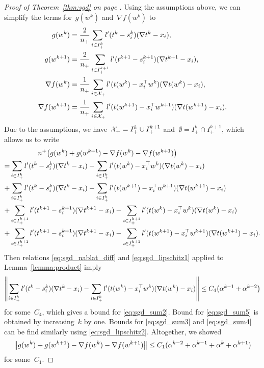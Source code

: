 \begin{proof}[Proof of Theorem~\ref{thm:sgd} on page \pageref{thm:sgd}]
  Using the assumptions above, we can simplify the terms for~$g(w^k)$ and~$\nabla f(w^k)$ to
  \begin{equation*}
    \begin{aligned}
      g(w^k)
      & = \frac{2}{n_+}\sum_{i\in I_+^k}l'(t^k-s_i^k)(\nabla t^k - x_i), \\
      g(w^{k+1})
      & = \frac{2}{n_+}\sum_{i\in I_+^{k+1}}l'(t^{k+1}-s_i^{k+1})(\nabla t^{k+1} - x_i), \\
      \nabla f(w^k)
      & = \frac{1}{n_+}\sum_{i \in \mathcal{X}_+}l'(t(w^k)-x_i^\top w^k)(\nabla t(w^k) - x_i), \\
      \nabla f(w^{k+1})
      & = \frac{1}{n_+}\sum_{i \in \mathcal{X}_+}l'(t(w^{k+1})-x_i^\top w^{k+1})(\nabla t(w^{k+1}) - x_i).
    \end{aligned}
  \end{equation*}
  Due to the assumptions, we have~$\mathcal{X}_+=I_+^k\cup I_+^{k+1}$ and~$\emptyset=I_+^k\cap I_+^{k+1}$, which allows us to write
  \begin{subequations}\label{eq:sgd_sum}
    \begin{align}
    \label{eq:sgd_sum1}
    & \qquad\qquad n^+\Brac{g(w^k)+g(w^{k+1})-\nabla f(w^k)-\nabla f(w^{k+1})}\\
    \label{eq:sgd_sum2}
    = & \sum_{i\in I_+^k}l'(t^k-s_i^k)(\nabla t^k - x_i) - \sum_{i\in I_+^k}l'(t(w^k)-x_i^\top w^k)(\nabla t(w^k) - x_i) \\
    \label{eq:sgd_sum3}
    + &\sum_{i\in I_+^k}l'(t^k-s_i^k)(\nabla t^k - x_i) - \sum_{i\in I_+^k}l'(t(w^{k+1})-x_i^\top w^{k+1})(\nabla t(w^{k+1}) - x_i)\\
    \label{eq:sgd_sum4}
    + &\sum_{i\in I_+^{k+1}}l'(t^{k+1}-s_i^{k+1})(\nabla t^{k+1} - x_i) - \sum_{i\in I^{k+1}_+}l'(t(w^k)-x_i^\top w^k)(\nabla t(w^k) - x_i) \\
    \label{eq:sgd_sum5}
    + &\sum_{i\in I_+^{k+1}}l'(t^{k+1}-s_i^{k+1})(\nabla t^{k+1} - x_i)  - \sum_{i\in I_+^{k+1}}l'(t(w^{k+1})-x_i^\top w^{k+1})(\nabla t(w^{k+1}) - x_i).
    \end{align}
  \end{subequations}
  Then relations \eqref{eq:sgd_nablat_diff} and \eqref{eq:sgd_lipschitz1} applied to Lemma~\ref{lemma:product} imply
  \begin{equation*}
    \nrm{\sum_{i\in I_+^k}l'(t^k-s_i^k)(\nabla t^k - x_i) - \sum_{i\in I_+^k}l'(t(w^k)-x_i^\top w^k)(\nabla t(w^k) - x_i)} \le C_4\Brac{\alpha^{k-1} + \alpha^{k-2}}
  \end{equation*}
  for some~$C_4$, which gives a bound for \eqref{eq:sgd_sum2}. Bound for \eqref{eq:sgd_sum5} is obtained by increasing~$k$ by one. Bounds for \eqref{eq:sgd_sum3} and \eqref{eq:sgd_sum4} can be find similarly using \eqref{eq:sgd_lipschitz2}. Altogether, we showed
  \begin{equation}\label{eq:nec_cond3}
  \norm{g(w^k)+g(w^{k+1})-\nabla f(w^k)-\nabla f(w^{k+1})} \le C_1(\alpha^{k-2} + \alpha^{k-1} + \alpha^{k} + \alpha^{k+1})
  \end{equation}
  for some~$C_1$.


\end{proof}
